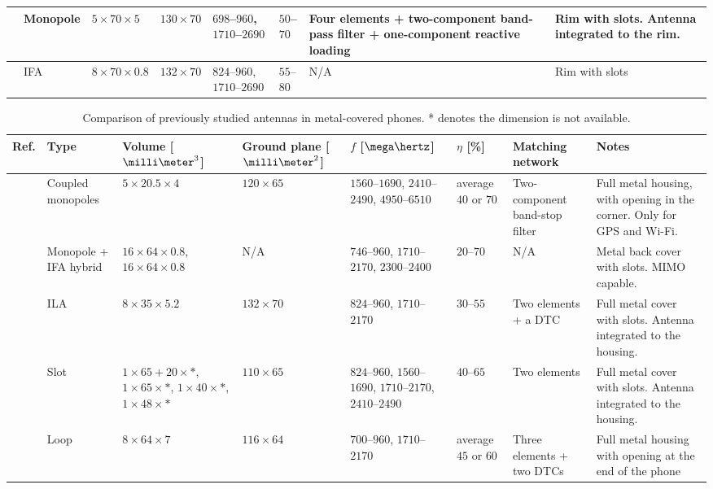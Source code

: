 \begin{table}
\begin{tabular}{|M{0.03\textheight}|M{0.11\textheight}|M{0.11\textheight}|M{0.11\textheight}|M{0.1\textheight}|M{0.06\textheight}|M{0.15\textheight}|>{\Centering\hspace*{0pt}}M{0.18\textheight}|}
    \hline
    \cite{chen_metal_frame} & Monopole & $5\times70\times5$ & $130\times70$ & $698$--$960$, $1710$--$2690$ & $50$--$70$ & Four elements + two-component band-pass filter + one-component reactive loading & Rim with slots. Antenna integrated to the rim.\\
    \hline
    \cite{hepta_ifa} & IFA & $8\times70\times0.8$ & $132\times70$ & $824$--$960$, $1710$--$2690$ & $55$--$80$ & N/A & Rim with slots\\
    \hline
\end{tabular}
\end{table}

\begin{table}
\centering
\caption{Comparison of previously studied antennas in metal-covered phones. * denotes the dimension is not available.}
\label{tab:metal_cover_comp}
\begin{tabular}{|M{0.03\textheight}|M{0.11\textheight}|M{0.11\textheight}|M{0.11\textheight}|M{0.1\textheight}|M{0.07\textheight}|M{0.15\textheight}|M{0.18\textheight}|}
    \hline
    \textbf{Ref.} & \textbf{Type} & \textbf{Volume [$\milli\meter^3$]} & \textbf{Ground plane [$\milli\meter^2$]} & \textbf{$f$ [$\mega\hertz$]} & \textbf{$\eta$ [\%]} & \textbf{Matching network} & \textbf{Notes}\\
    \hline
    \cite{wu_pier} & Coupled monopoles & $5\times20.5\times4$ & $120\times65$ & $1560$--$1690$, $2410$--$2490$, $4950$--$6510$ & average $40$ or $70$ & Two-component band-stop filter & Full metal housing, with opening in the corner. Only for GPS and Wi-Fi.\\
    \hline
    \cite{son_wideband_mimo} & Monopole + IFA hybrid & $16\times64\times0.8$, $16\times64\times0.8$ & N/A & $746$--$960$, $1710$--$2170$, $2300$--$2400$ & $20$--$70$ & N/A & Metal back cover with slots. MIMO capable.\\
    \hline
    \cite{wu_tunable} & ILA & $8\times35\times5.2$ & $132\times70$ & $824$--$960$, $1710$--$2170$ & $30$--$55$ & Two elements + a DTC & Full metal cover with slots. Antenna integrated to the housing.\\
    \hline
    \cite{zhong_pier} & Slot & $1\times65+20\times*$, $1\times65\times*$, $1\times40\times*$, $1\times48\times*$ & $110\times65$ & $824$--$960$, $1560$--$1690$, $1710$--$2170$, $2410$--$2490$ & $40$--$65$ & Two elements & Full metal cover with slots. Antenna integrated to the housing.\\
    \hline
    \cite{chen_compact_lte} & Loop & $8\times64\times7$ & $116\times64$ & $700$--$960$, $1710$--$2170$ & average $45$ or $60$ & Three elements + two DTCs & Full metal housing with opening at the end of the phone\\
    \hline
\end{tabular}
\end{table}

\clearpage